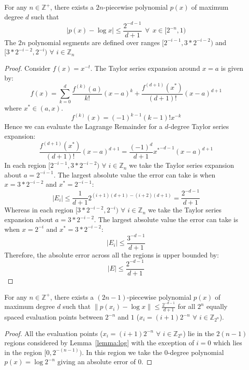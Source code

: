 \begin{lemma}
For any $n \in \mathbb{Z}^+$, there exists a $2n$-piecewise polynomial $p(x)$ of maximum degree $d$ such that 
$$|p(x) - \log x| \leq \frac{2^{-d-1}}{d+1} \>\>\forall\>\> x\in [2^{-n}, 1)$$
The $2n$ polynomial segments are defined over ranges $[2^{-i-1}, 3*2^{-i-2})$ and $[3*2^{-i-2}, 2^{-i})$ $\forall$ $i \in \mathbb{Z}_n$
\label{lemma:log}
\end{lemma}
\begin{proof}
Consider $f(x) = x^{-t}$. The Taylor series expansion around $x=a$ is given by:
\begin{equation}
    f(x) = \sum_{k=0}^d \frac{f^{(k)}(a)}{k!}(x-a)^k + \frac{f^{(d+1)}(x^*)}{(d+1)!}(x-a)^{d+1}
\end{equation}
where $x^* \in (a,x)$.
\begin{equation}
    f^{(k)}(x) = (-1)^{k-1} (k-1)! x^{-k}
\end{equation}
Hence we can evaluate the Lagrange Remainder for a $d$-degree Taylor series expansion:
\begin{equation}
    \frac{f^{(d+1)}(x^*)}{(d+1)!}(x-a)^{d+1} = \frac{(-1)^{d}}{d+1}  {x^*}^{-d-1}(x-a)^{d+1}
\end{equation}
In each region $[2^{-i-1}, 3*2^{-i-2})$ $\forall$ $i \in \mathbb{Z}_n$ we take the Taylor series expansion about $a=2^{-i-1}$. The largest absolute value the error can take is when $x = 3*2^{-i-2}$ and $x^* = 2^{-i-1}$:
\begin{equation}
    |E_{i}| \leq \frac{1}{d+1}2^{(i+1)(d+1) - (i+2)(d+1)} = \frac{2^{-d-1}}{d+1}
\end{equation}
Whereas in each region $[3*2^{-i-2}, 2^{-i})$   $\forall$ $i \in \mathbb{Z}_n$ we take the Taylor series expansion about $a=3*2^{-i-2}$. The largest absolute value the error can take is when $x = 2^{-i}$ and $x^* = 3*2^{-i-2}$:
\begin{equation}
    |E_{i}| \leq \frac{3^{-d-1}}{d+1}
\end{equation}
Therefore, the absolute error across all the regions is upper bounded by:
\begin{equation}
    |E| \leq \frac{2^{-d-1}}{d+1}
\end{equation}
\end{proof}
\begin{duplicate}
For any $n \in \mathbb{Z}^+$, there exists a $(2n-1)$-piecewise polynomial $p(x)$ of maximum degree $d$ such that $\|p(x_i)- \log x\| \leq \frac{2^{-d-1}}{d+1}$ for all $2^{n}$ equally spaced evaluation points between $2^{-n}$ and $1$ ($x_i = (i+1)2^{-n}$ $\forall$ $i \in \mathbb{Z}_{2^{n}}$).
\end{duplicate}
\begin{proof}
    All the evaluation points ($x_i = (i+1)2^{-n}$ $\forall$ $i \in \mathbb{Z}_{2^{n}}$) lie in the $2(n-1)$ regions considered by Lemma~\ref{lemma:log} with the exception of $i = 0$ which lies in the region $[0, 2^{-(n-1)})$. In this region we take the 0-degree polynomial $p(x) = \log 2^{-n} $ giving an absolute error of 0.
\end{proof}
